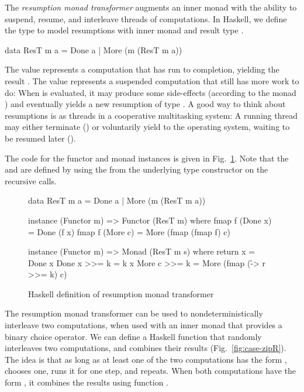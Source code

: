The \emph{resumption monad transformer} \cite{Papaspyrou01} augments an inner monad with the ability to suspend, resume, and interleave threads of computations. In Haskell, we define the type  to model resumptions with inner monad  and result type .
%
\begin{hscode}
data ResT m a = Done a | More (m (ResT m a))
\end{hscode}
%
The value  represents a computation that has run to completion, yielding the result . The value  represents a suspended computation that still has more work to do: When  is evaluated, it may produce some side-effects (according to the monad ) and eventually yields a new resumption of type . A good way to think about resumptions is as threads in a cooperative multitasking system: A running thread may either terminate () or voluntarily yield to the operating system, waiting to be resumed later ().

The code for the functor and monad instances is given in Fig.~\ref{fig:case-resumption-transformer}. Note that the  and \hs{(>{}>=)} are defined by using the  from the underlying type constructor  on the recursive calls.

\begin{figure}
\begin{hscode}
data ResT m a = Done a | More (m (ResT m a))
\end{hscode}
\begin{hscode}
instance (Functor m) => Functor (ResT m) where
  fmap f (Done x) = Done (f x)
  fmap f (More c) = More (fmap (fmap f) c)
\end{hscode}
\begin{hscode}
instance (Functor m) => Monad (ResT m s) where
  return x     = Done x
  Done x >>= k = k x
  More c >>= k = More (fmap (\r -> r >>= k) c)
\end{hscode}
\caption{Haskell definition of resumption monad transformer}
\label{fig:case-resumption-transformer}
\end{figure}

The resumption monad transformer can be used to nondeterministically interleave two computations, when used with an inner monad that provides a binary choice operator. We can define a Haskell function  that randomly interleaves two computations, and combines their results (Fig.~\ref{fig:case-zipR}). The idea is that as long as at least one of the two computations has the form ,  chooses one, runs it for one step, and repeats. When both computations have the form , it combines the results using function .

